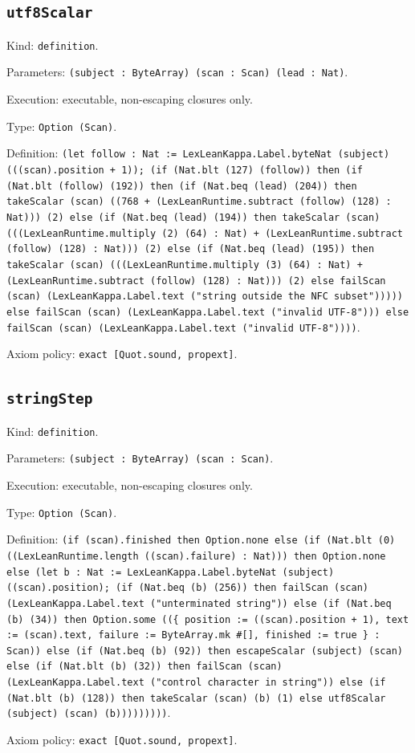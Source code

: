 \documentclass[11pt]{article}
\begin{document}
\subsection*{\texttt{utf8Scalar}}
\noindent Kind: \texttt{definition}.\par
\noindent Parameters: \texttt{(subject : ByteArray) (scan : Scan) (lead : Nat)}.\par
\noindent Execution: executable, non-escaping closures only.\par
\noindent Type: \texttt{Option (Scan)}.\par
\noindent Definition: \texttt{(let follow : Nat := LexLeanKappa.Label.byteNat (subject) (((scan).position + 1)); (if (Nat.blt (127) (follow)) then (if (Nat.blt (follow) (192)) then (if (Nat.beq (lead) (204)) then takeScalar (scan) ((768 + (LexLeanRuntime.subtract (follow) (128) : Nat))) (2) else (if (Nat.beq (lead) (194)) then takeScalar (scan) (((LexLeanRuntime.multiply (2) (64) : Nat) + (LexLeanRuntime.subtract (follow) (128) : Nat))) (2) else (if (Nat.beq (lead) (195)) then takeScalar (scan) (((LexLeanRuntime.multiply (3) (64) : Nat) + (LexLeanRuntime.subtract (follow) (128) : Nat))) (2) else failScan (scan) (LexLeanKappa.Label.text ("string outside the NFC subset"))))) else failScan (scan) (LexLeanKappa.Label.text ("invalid UTF-8"))) else failScan (scan) (LexLeanKappa.Label.text ("invalid UTF-8"))))}.\par
\noindent Axiom policy: \texttt{exact [Quot.sound, propext]}.\par
\subsection*{\texttt{stringStep}}
\noindent Kind: \texttt{definition}.\par
\noindent Parameters: \texttt{(subject : ByteArray) (scan : Scan)}.\par
\noindent Execution: executable, non-escaping closures only.\par
\noindent Type: \texttt{Option (Scan)}.\par
\noindent Definition: \texttt{(if (scan).finished then Option.none else (if (Nat.blt (0) ((LexLeanRuntime.length ((scan).failure) : Nat))) then Option.none else (let b : Nat := LexLeanKappa.Label.byteNat (subject) ((scan).position); (if (Nat.beq (b) (256)) then failScan (scan) (LexLeanKappa.Label.text ("unterminated string")) else (if (Nat.beq (b) (34)) then Option.some ((\{ position := ((scan).position + 1), text := (scan).text, failure := ByteArray.mk \#[], finished := true \} : Scan)) else (if (Nat.beq (b) (92)) then escapeScalar (subject) (scan) else (if (Nat.blt (b) (32)) then failScan (scan) (LexLeanKappa.Label.text ("control character in string")) else (if (Nat.blt (b) (128)) then takeScalar (scan) (b) (1) else utf8Scalar (subject) (scan) (b)))))))))}.\par
\noindent Axiom policy: \texttt{exact [Quot.sound, propext]}.\par
\end{document}
